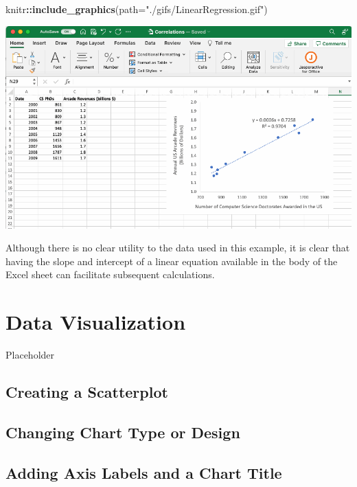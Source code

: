 \documentclass[
]{book}
\newenvironment{Shaded}{\begin{snugshade}}{\end{snugshade}}
\newcommand{\AttributeTok}[1]{\textcolor[rgb]{0.13,0.29,0.53}{#1}}
\newcommand{\FunctionTok}[1]{\textcolor[rgb]{0.13,0.29,0.53}{\textbf{#1}}}
\newcommand{\NormalTok}[1]{#1}
\newcommand{\SpecialCharTok}[1]{\textcolor[rgb]{0.81,0.36,0.00}{\textbf{#1}}}
\newcommand{\StringTok}[1]{\textcolor[rgb]{0.31,0.60,0.02}{#1}}
\begin{document}
\begin{Shaded}
\begin{Highlighting}[]
\NormalTok{knitr}\SpecialCharTok{::}\FunctionTok{include\_graphics}\NormalTok{(}\AttributeTok{path=}\StringTok{"./gifs/LinearRegression.gif"}\NormalTok{)}
\end{Highlighting}
\end{Shaded}

\includegraphics{./gifs/LinearRegression.gif}

Although there is no clear utility to the data used in this example, it is clear that having the slope and intercept of a linear equation available in the body of the Excel sheet can facilitate subsequent calculations.

\hypertarget{data-visualization}{%
\chapter{Data Visualization}\label{data-visualization}}

Placeholder

\hypertarget{creating-a-scatterplot}{%
\section{Creating a Scatterplot}\label{creating-a-scatterplot}}

\hypertarget{changing-chart-type-or-design}{%
\section{Changing Chart Type or Design}\label{changing-chart-type-or-design}}

\hypertarget{adding-axis-labels-and-a-chart-title}{%
\section{Adding Axis Labels and a Chart Title}\label{adding-axis-labels-and-a-chart-title}}
\end{document}

